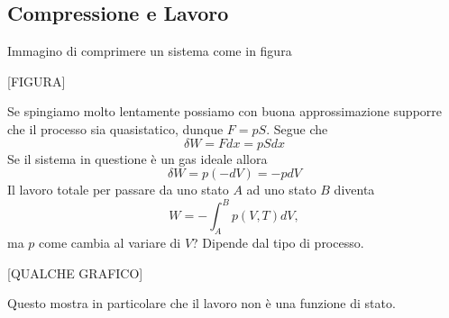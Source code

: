 \subsection{Compressione e Lavoro}
Immagino di comprimere un sistema come in figura 

[FIGURA]

\noindent
Se spingiamo molto lentamente possiamo con buona approssimazione supporre che il processo sia quasistatico, dunque $F=pS$. Segue che
\[\boxed{\delta W=Fdx=pSdx}\]
Se il sistema in questione \`e un gas ideale allora
\[\delta W=p(-dV)=-pdV\]
Il lavoro totale per passare da uno stato $A$ ad uno stato $B$ diventa
\[W=-\int_{A}^{B} p(V,T)dV,\]
ma $p$ come cambia al variare di $V$? Dipende dal tipo di processo.

[QUALCHE GRAFICO]

\noindent
Questo mostra in particolare che il lavoro non \`e una funzione di stato.
